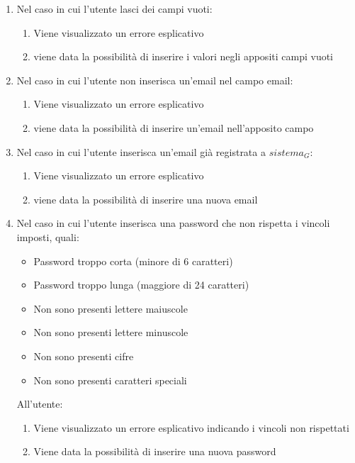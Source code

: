 \begin{enumerate}
    \item Nel caso in cui l'utente lasci dei campi vuoti: 
    \begin{enumerate}
        \item Viene visualizzato un errore esplicativo
        \item viene data la possibilità di inserire i valori negli appositi campi vuoti
    \end{enumerate}
    \item Nel caso in cui l'utente non inserisca un'email nel campo email:
    \begin{enumerate}
        \item Viene visualizzato un errore esplicativo
        \item viene data la possibilità di inserire un'email nell'apposito campo
    \end{enumerate}
    \item Nel caso in cui l'utente inserisca un'email già registrata a $\textit{sistema}_G$:
    \begin{enumerate}
        \item Viene visualizzato un errore esplicativo
        \item viene data la possibilità di inserire una nuova email
    \end{enumerate}
    \item Nel caso in cui l'utente inserisca una password che non rispetta i vincoli imposti, quali:
    \begin{itemize}
        \item Password troppo corta (minore di 6 caratteri)
        \item Password troppo lunga (maggiore di 24 caratteri)
        \item Non sono presenti lettere maiuscole
        \item Non sono presenti lettere minuscole
        \item Non sono presenti cifre
        \item Non sono presenti caratteri speciali
    \end{itemize}
    All'utente:
    \begin{enumerate}
        \item Viene visualizzato un errore esplicativo indicando i vincoli non rispettati
        \item Viene data la possibilità di inserire una nuova password
    \end{enumerate}
\end{enumerate}
\newpage